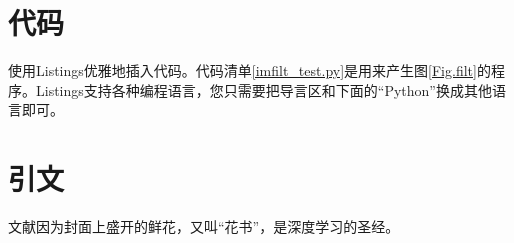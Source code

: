 \documentclass[a4paper, 12pt, centering, AutoFakeBold]{article}
\begin{document}
\section{代码}
使用Listings优雅地插入代码。代码清单\ref{imfilt_test.py}是用来产生图\ref{Fig.filt}的程序。Listings支持各种编程语言，您只需要把导言区和下面的“Python”换成其他语言即可。


\section{引文}
文献\cite{Goodfellow-et-al-2016}因为封面上盛开的鲜花，又叫“花书”，是深度学习的圣经。


\end{document}
